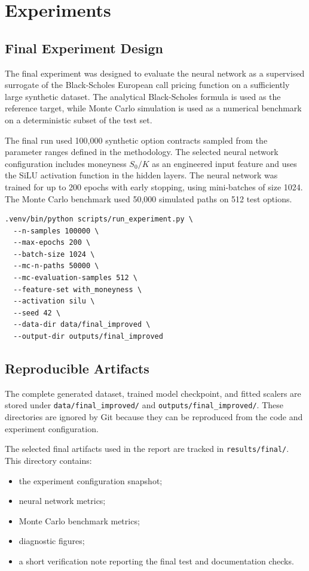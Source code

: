 \chapter{Experiments}

\section{Final Experiment Design}

The final experiment was designed to evaluate the neural network as a supervised surrogate of the Black-Scholes European call pricing function on a sufficiently large synthetic dataset.
The analytical Black-Scholes formula is used as the reference target, while Monte Carlo simulation is used as a numerical benchmark on a deterministic subset of the test set.

The final run used 100,000 synthetic option contracts sampled from the parameter ranges defined in the methodology.
The selected neural network configuration includes moneyness $S_0/K$ as an engineered input feature and uses the SiLU activation function in the hidden layers.
The neural network was trained for up to 200 epochs with early stopping, using mini-batches of size 1024.
The Monte Carlo benchmark used 50,000 simulated paths on 512 test options.

\begin{lstlisting}[style=pythonstyle, caption={Command used for the final experiment.}]
.venv/bin/python scripts/run_experiment.py \
  --n-samples 100000 \
  --max-epochs 200 \
  --batch-size 1024 \
  --mc-n-paths 50000 \
  --mc-evaluation-samples 512 \
  --feature-set with_moneyness \
  --activation silu \
  --seed 42 \
  --data-dir data/final_improved \
  --output-dir outputs/final_improved
\end{lstlisting}

\section{Reproducible Artifacts}

The complete generated dataset, trained model checkpoint, and fitted scalers are stored under \texttt{data/final\_improved/} and \texttt{outputs/final\_improved/}.
These directories are ignored by Git because they can be reproduced from the code and experiment configuration.

The selected final artifacts used in the report are tracked in \texttt{results/final/}.
This directory contains:

\begin{itemize}
    \item the experiment configuration snapshot;
    \item neural network metrics;
    \item Monte Carlo benchmark metrics;
    \item diagnostic figures;
    \item a short verification note reporting the final test and documentation checks.
\end{itemize}

